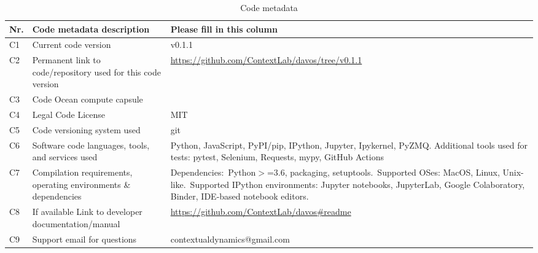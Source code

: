 \documentclass[preprint,12pt, a4paper]{elsarticle}
\begin{document}
\begin{table}[H]
\begin{tabular}{|l|p{6.5cm}|p{6.5cm}|}
\hline
\textbf{Nr.} & \textbf{Code metadata description} & \textbf{Please fill in this column} \\
\hline
C1 & Current code version &  v0.1.1 \\
\hline
C2 & Permanent link to code/repository used for this code version & \url{https://github.com/ContextLab/davos/tree/v0.1.1} \\
\hline
C3 & Code Ocean compute capsule & \\
\hline
C4 & Legal Code License & MIT \\
\hline
C5 & Code versioning system used & git \\
\hline
C6 & Software code languages, tools, and services used & Python, JavaScript, PyPI/pip, IPython, Jupyter, Ipykernel, PyZMQ. Additional tools used for tests: pytest, Selenium, Requests, mypy, GitHub Actions \\
\hline
C7 & Compilation requirements, operating environments \& dependencies & Dependencies:~Python$>$=3.6, packaging, setuptools.~Supported OSes: MacOS, Linux, Unix-like.~Supported IPython environments: Jupyter notebooks, JupyterLab, Google Colaboratory, Binder, IDE-based notebook editors. \\
\hline
C8 & If available Link to developer documentation/manual & \url{https://github.com/ContextLab/davos\#readme} \\
\hline
C9 & Support email for questions & contextualdynamics@gmail.com \\
\hline
\end{tabular}
\caption{Code metadata}
\label{}
\end{table}

\linenumbers


\end{document}
